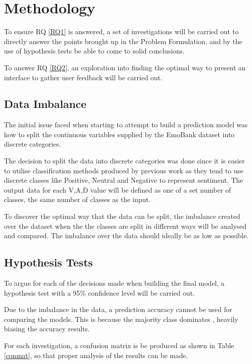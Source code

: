    
\section{Methodology}
 
To ensure RQ \ref{RQ1} is answered, a set of investigations will be carried out to directly answer the points brought up in the Problem Formulation, and by the use of hypothesis tests be able to come to solid conclusions. 

To answer RQ \ref{RQ2}, an exploration into finding the optimal way to present an interface to gather user feedback will be carried out.

\subsection{Data Imbalance}

The initial issue faced when starting to attempt to build a prediction model was how to split the continuous variables supplied by the EmoBank dataset into discrete categories.

The decision to split the data into discrete categories was done since it is easier to utilise classification methods produced by previous work as they tend to use discrete classes like Positive, Neutral and Negative to represent sentiment. The output data for each V,A,D value will be defined as one of a set number of classes, the same number of classes as the input.

To discover the optimal way that the data can be split, the imbalance created over the dataset when the the classes are split in different ways will be analysed and compared. The imbalance over the data should ideally be as low as possible.

\subsection{Hypothesis Tests}

To argue for each of the decisions made when building the final model, a hypothesis test with a 95\% confidence level will be carried out.

Due to the imbalance in the data, a prediction accuracy cannot be used for comparing the models. This is because the majority class dominates \cite{al2015applied}, heavily biasing the accuracy results.

For each investigation,  a confusion matrix is be produced as shown in Table \ref{conmat}, so that proper analysis of the results can be made.

